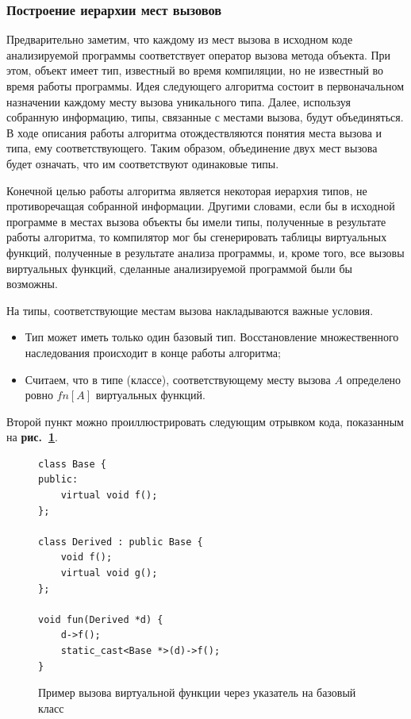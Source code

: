 \documentclass[a4paper,12pt,russian]{article}
\newcommand{\picref}[1]{\textbf{рис.~\ref{#1}}}
\begin{document}
\subsubsection{Построение иерархии мест вызовов}
Предварительно заметим, что каждому из мест вызова в исходном коде анализируемой программы соответствует оператор вызова метода объекта.
При этом, объект имеет тип, известный во время компиляции, но не известный во время работы программы.
Идея следующего алгоритма состоит в первоначальном назначении каждому месту вызова уникального типа.
Далее, используя собранную информацию, типы, связанные с местами вызова, будут объединяться.
В ходе описания работы алгоритма отождествляются понятия места вызова и типа, ему соответствующего.
Таким образом, объединение двух мест вызова будет означать, что им соответствуют одинаковые типы.

Конечной целью работы алгоритма является некоторая иерархия типов, не противоречащая собранной информации.
Другими словами, если бы в исходной программе в местах вызова объекты бы имели типы, полученные в результате работы алгоритма,
то компилятор мог бы сгенерировать таблицы виртуальных функций, полученные в результате анализа программы, и, кроме того, все вызовы виртуальных функций,
сделанные анализируемой программой были бы возможны.

На типы, соответствующие местам вызова накладываются важные условия.
\begin{itemize}
\item Тип может иметь только один базовый тип. Восстановление множественного наследования происходит в конце работы алгоритма;
\item Считаем, что в типе (классе), соответствующему месту вызова $A$ определено ровно $fn[A]$ виртуальных функций.
\end{itemize}
Второй пункт можно проиллюстрировать следующим отрывком кода, показанным на \picref{min_vsize_ex_lst}.
\begin{figure}
\begin{lstlisting}
class Base {
public:
    virtual void f();
};

class Derived : public Base {
    void f();
    virtual void g();
};

void fun(Derived *d) {
    d->f();
    static_cast<Base *>(d)->f();
}
\end{lstlisting}
\caption{Пример вызова виртуальной функции через указатель на базовый класс}
\label{min_vsize_ex_lst}
\end{figure}
\end{document}
